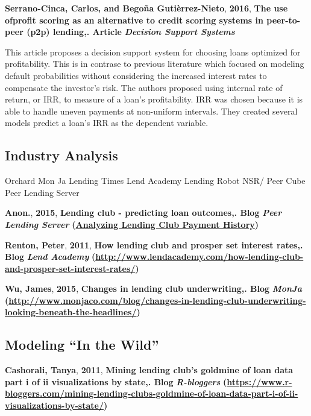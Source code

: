 \documentclass[conference,final,]{IEEEtran}
\begin{document}
\textbf{Serrano-Cinca, Carlos, and Begoña Gutièrrez-Nieto},
\textbf{2016}, \textbf{The use ofprofit scoring as an alternative to
credit scoring systems in peer-to-peer (p2p) lending,}\textbf{. Article}
\textbf{\emph{Decision Support Systems}}

This article proposes a decision support system for choosing loans
optimized for profitability. This is in contrase to previous literature
which focused on modeling default probabilities without considering the
increased interest rates to compensate the investor's risk. The authors
proposed using internal rate of return, or IRR, to measure of a loan's
profitability. IRR was chosen because it is able to handle uneven
payments at non-uniform intervals. They created several models predict a
loan's IRR as the dependent variable.

\subsection{Industry Analysis}\label{industry-analysis}

Orchard Mon Ja Lending Times Lend Academy Lending Robot NSR/ Peer Cube
Peer Lending Server

\textbf{Anon.}, \textbf{2015}, \textbf{Lending club - predicting loan
outcomes,}\textbf{. Blog} \textbf{\emph{Peer Lending Server}}\textbf{
(\href{Analyzing\%20Lending\%20Club\%20Payment\%20History}{Analyzing Lending Club Payment History})}

\textbf{Renton, Peter}, \textbf{2011}, \textbf{How lending club and
prosper set interest rates,}\textbf{. Blog} \textbf{\emph{Lend
Academy}}\textbf{
(\url{http://www.lendacademy.com/how-lending-club-and-prosper-set-interest-rates/})}

\textbf{Wu, James}, \textbf{2015}, \textbf{Changes in lending club
underwriting,}\textbf{. Blog} \textbf{\emph{MonJa}}\textbf{
(\url{http://www.monjaco.com/blog/changes-in-lending-club-underwriting-looking-beneath-the-headlines/})}

\subsection{\texorpdfstring{Modeling ``In the
Wild''}{Modeling In the Wild}}\label{modeling-in-the-wild}

\textbf{Cashorali, Tanya}, \textbf{2011}, \textbf{Mining lending club's
goldmine of loan data part i of ii visualizations by state,}\textbf{.
Blog} \textbf{\emph{R-bloggers}}\textbf{
(\url{https://www.r-bloggers.com/mining-lending-clubs-goldmine-of-loan-data-part-i-of-ii-visualizations-by-state/})}
\end{document}
